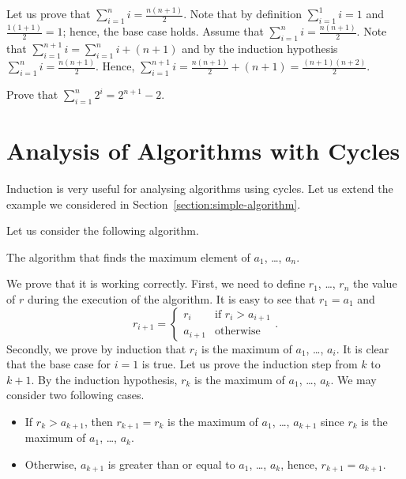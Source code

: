 Let us prove that $\sum_{i = 1}^n i = \frac{n (n + 1)}{2}$.
Note that by definition $\sum_{i = 1}^1 i = 1$ and
$\frac{1 (1 + 1)}{2} = 1$; hence, the base case holds. Assume that
$\sum_{i = 1}^n i = \frac{n (n + 1)}{2}$. Note that
$\sum_{i = 1}^{n + 1} i = \sum_{i = 1}^n i + (n + 1)$ and by the
induction hypothesis $\sum_{i = 1}^n i = \frac{n (n + 1)}{2}$.
Hence, $\sum_{i = 1}^{n + 1} i = \frac{n (n + 1)}{2} + (n + 1) =
\frac{(n + 1)(n + 2)}{2}$.

\begin{exercise}
    Prove that $\sum_{i = 1}^n 2^i = 2^{n + 1} - 2$.
\end{exercise}

\section{Analysis of Algorithms with Cycles}

Induction is very useful for analysing algorithms using cycles. Let us extend
the example we considered in Section~\ref{section:simple-algorithm}.

Let us consider the following algorithm.
\begin{algorithm}
  \begin{algorithmic}[1]
        \EndIf
      \EndFor
      \State{}
    \EndFunction
  \end{algorithmic}
  \caption{The algorithm that finds the maximum element of $a_1$, \dots, $a_n$.}
\end{algorithm}
We prove that it is working correctly. First, we need to define $r_1$,
\dots, $r_n$ the value of $r$ during the execution of the algorithm.
It is easy to see that $r_1 = a_1$ and
\[
    r_{i + 1} =
    \begin{cases}
        r_i & \text{if } r_i > a_{i + 1} \\
        a_{i + 1} & \text{otherwise}
    \end{cases}.
\]
Secondly, we prove by induction that $r_i$ is the maximum of $a_1$, \dots,
$a_i$. It is clear that the base case for $i = 1$ is true. Let us prove the
induction step from $k$ to $k + 1$. By the induction hypothesis, $r_k$
is the maximum of $a_1$, \dots, $a_k$. We may consider two following cases.
\begin{itemize}
    \item If $r_k > a_{k + 1}$, then $r_{k + 1} = r_{k}$ is the maximum of $a_1$,
        \dots, $a_{k + 1}$ since $r_k$ is the maximum of $a_1$, \dots, $a_k$.
    \item Otherwise, $a_{k + 1}$ is greater than or equal to $a_1$, \dots, $a_k$,
        hence, $r_{k + 1} = a_{k + 1}$.
\end{itemize}

